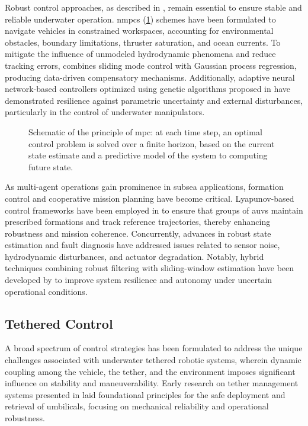 Robust control approaches, as described in \cite{heshmati-alamdariRobustPredictiveControl2020},
remain essential to ensure stable and reliable underwater operation. \Acp{nmpc}
(\cref{sota_c_uc_mpc}) schemes have been formulated to navigate vehicles in constrained workspaces,
accounting for environmental obstacles, boundary limitations, thruster saturation, and ocean
currents. To mitigate the influence of unmodeled hydrodynamic phenomena and reduce tracking errors,
\cite{limaSlidingModeControl2020} combines sliding mode control with Gaussian process regression,
producing data-driven compensatory mechanisms. Additionally, adaptive neural network-based
controllers optimized using genetic algorithms proposed in \cite{salloomAdaptiveNeuralNetwork2020}
have demonstrated resilience against parametric uncertainty and external disturbances, particularly
in the control of underwater manipulators.

\begin{figure}
	\centering
	
	\caption{
		Schematic of the principle of \ac{mpc}: at each time step, an optimal control problem is solved
		over a finite horizon, based on the current state estimate and a predictive model of the system to
		computing future state.
	}
	\label{sota_c_uc_mpc}
\end{figure}

As multi-agent operations gain prominence in subsea applications, formation control and cooperative
mission planning have become critical. Lyapunov-based control frameworks have been employed in
\cite{khalajiLyapunovBasedFormationControl2020} to ensure that groups of \acp{auv} maintain
prescribed formations and track reference trajectories, thereby enhancing robustness and mission
coherence. Concurrently, advances in robust state estimation and fault diagnosis have addressed
issues related to sensor noise, hydrodynamic disturbances, and actuator degradation. Notably,
hybrid techniques combining robust filtering with sliding-window estimation have been developed by
\cite{songRobustStateEstimation2023} to improve system resilience and autonomy under uncertain
operational conditions.

\subsection{Tethered  Control}\label{sota_c_tethered_uuv_control}

A broad spectrum of control strategies has been formulated to address the unique challenges
associated with underwater tethered robotic systems, wherein dynamic coupling among the vehicle,
the tether, and the environment imposes significant influence on stability and maneuverability.
Early research on tether management systems presented in \cite{abelUnderwaterVehicleTether1994}
laid foundational principles for the safe deployment and retrieval of umbilicals, focusing on
mechanical reliability and operational robustness.

